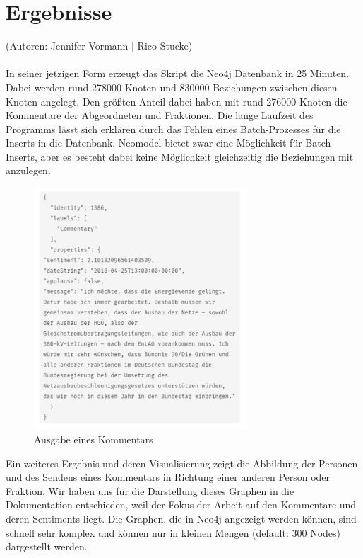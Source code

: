 \section{Ergebnisse}\label{sec:04_04_ergebnisse}
(Autoren: Jennifer Vormann | Rico Stucke)\\
\\
In seiner jetzigen Form erzeugt das Skript die Neo4j Datenbank in 25 Minuten. Dabei werden rund 278000 Knoten und 830000 Beziehungen zwischen diesen Knoten angelegt. Den größten Anteil dabei haben mit rund 276000 Knoten die Kommentare der Abgeordneten und Fraktionen. Die lange Laufzeit des Programms lässt sich erklären durch das Fehlen eines Batch-Prozesses für die Inserts in die Datenbank. Neomodel bietet zwar eine Möglichkeit für Batch-Inserts, aber es besteht dabei keine Möglichkeit gleichzeitig die Beziehungen mit anzulegen.\\
\begin{figure}[htb]
    \centering
    \includegraphics[width=8cm]{chapters/05-Interaktion-Abgeord/5.PNG} 
    \caption{Ausgabe eines Kommentars}
    \label{fig:chapters/05-Interaktion-Abgeord/5.PNG}
\end{figure}
Ein weiteres Ergebnis und deren Visualisierung zeigt die Abbildung der Personen und des Sendens eines Kommentars in Richtung einer anderen Person oder Fraktion. Wir haben uns für die Darstellung dieses Graphen in die Dokumentation entschieden, weil der Fokus der Arbeit auf den Kommentare und deren Sentiments liegt. Die Graphen, die in Neo4j angezeigt werden können, sind schnell sehr komplex und können nur in kleinen Mengen (default: 300 Nodes) dargestellt werden.
